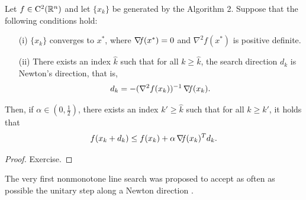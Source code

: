 \documentclass[10pt,a4paper]{article}
\begin{document}
\begin{proposition}
	Let $f\in\mathord{\mathrm{C^2}}(\mathbb{R}^n)$ and let $\{x_k\}$ be generated by the Algorithm 2. Suppose that the following conditions hold:
	\begin{itemize}
		\item[(i)] $\{x_k\}$ converges to $x^*$, where $\operatorname*{\mathit{\nabla \!f}}(x^*)=0$ and $\nabla^2 f(x^*)$ is positive definite.
		\item[(ii)] There exists an index $\hat{k}$ such that for all $k \geq \hat{k}$, the search direction $d_k$ is Newton's direction, that is,
		\begin{align*}
			d_k = -(\nabla^2 f(x_k))^{-1} \operatorname*{\mathit{\nabla \!f}}(x_k).
		\end{align*}
	\end{itemize}
	Then, if $\alpha \in \left(0,\frac{1}{2}\right)$, there exists an index $k' \geq \hat{k}$ such that for all $k\geq k'$, it holds that
	\begin{align*}
		f(x_k+d_k) \leq f(x_k)+ \alpha \operatorname*{\mathit{\nabla \!f}}(x_k)^T d_k.
	\end{align*}
\end{proposition}
\begin{proof}
	Exercise.
\end{proof}
\noindent The very first nonmonotone line search was proposed to accept as often as possible the unitary step along a Newton direction \cite{grippo86a}.
\end{document}
